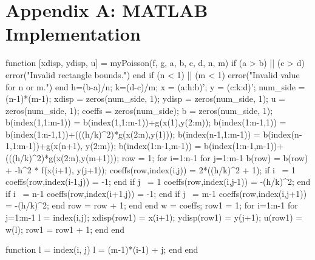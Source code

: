 \documentclass[12pt, titlepage]{article}
\begin{document}
    \section*{Appendix A\@: MATLAB Implementation}
    {\singlespacing
        \begin{code}
function [xdisp, ydisp, u] = myPoisson(f, g, a, b, c, d, n, m)
    if (a > b) || (c > d)
        error("Invalid rectangle bounds.")
    end
    if (n < 1) || (m < 1)
        error("Invalid value for n or m.")
    end
    h=(b-a)/n; k=(d-c)/m;
    x = (a:h:b)'; y = (c:k:d)';
    num_side = (n-1)*(m-1);
    xdisp = zeros(num_side, 1);
    ydisp = zeros(num_side, 1);
    u = zeros(num_side, 1);
    coeffs = zeros(num_side);
    b = zeros(num_side, 1);
    b(index(1,1:m-1)) = b(index(1,1:m-1))+g(x(1),y(2:m));
    b(index(1:n-1,1)) = b(index(1:n-1,1))+(((h/k)^2)*g(x(2:n),y(1)));
    b(index(n-1,1:m-1)) = b(index(n-1,1:m-1))+g(x(n+1), y(2:m));
    b(index(1:n-1,m-1)) = b(index(1:n-1,m-1))+(((h/k)^2)*g(x(2:n),y(m+1)));
    row = 1;
    for i=1:n-1
        for j=1:m-1
            b(row) = b(row) + -h^2 * f(x(i+1), y(j+1));
            coeffs(row,index(i,j)) = 2*((h/k)^2 + 1);
            if i ~= 1
                coeffs(row,index(i-1,j)) = -1;
            end
            if j ~= 1
                coeffs(row,index(i,j-1)) = -(h/k)^2;
            end
            if i ~= n-1
                coeffs(row,index(i+1,j)) = -1;
            end
            if j ~= m-1
                coeffs(row,index(i,j+1)) = -(h/k)^2;
            end
            row = row + 1;
        end
    end
    w = coeffs\b;
    row1 = 1;
    for i=1:n-1
        for j=1:m-1
            l = index(i,j);
            xdisp(row1) = x(i+1);
            ydisp(row1) = y(j+1);
            u(row1) = w(l);
            row1 = row1 + 1;
        end
    end

    function l = index(i, j)
        l = (m-1)*(i-1) + j;
    end
end
        \end{code}
    }
    \newpage 
    
    {}
\end{document}

